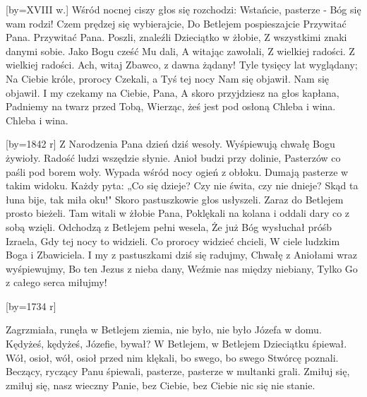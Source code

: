 \endsong
[by={XVIII w.}]
\beginverse
    Wśród nocnej ciszy głos się rozchodzi:
    Wstańcie, pasterze - Bóg się wam rodzi!
    Czem prędzej się wybierajcie,
    Do Betlejem pospieszajcie
    Przywitać Pana.
    Przywitać Pana.
\endverse
\beginverse
    Poszli, znaleźli Dzieciątko w żłobie,
    Z wszystkimi znaki danymi sobie.
    Jako Bogu cześć Mu dali,
    A witając zawołali,
    Z wielkiej radości.
    Z wielkiej radości.
\endverse
\beginverse
    Ach, witaj Zbawco, z dawna żądany!
    Tyle tysięcy lat wyglądany;
    Na Ciebie króle, prorocy
    Czekali, a Tyś tej nocy
    Nam się objawił.
    Nam się objawił.
\endverse
\beginverse
    I my czekamy na Ciebie, Pana,
    A skoro przyjdziesz na głos kapłana,
    Padniemy na twarz przed Tobą,
    Wierząc, żeś jest pod osłoną
    Chleba i wina.
    Chleba i wina.
\endverse
\endsong

[by={1842 r}]
\beginverse
Z Narodzenia Pana dzień dziś wesoły.
Wyśpiewują chwałę Bogu żywioły.
Radość ludzi wszędzie słynie.
Anioł budzi przy dolinie,
Pasterzów co paśli pod borem woły.
\endverse
\beginverse
Wypada wśród nocy ogień z obłoku.
Dumają pasterze w takim widoku.
Każdy pyta: „Co się dzieje?
Czy nie świta, czy nie dnieje?
Skąd ta łuna bije, tak miła oku!"
\endverse
\beginverse
Skoro pastuszkowie głos usłyszeli.
Zaraz do Betlejem prosto bieżeli.
Tam witali w żłobie Pana,
Poklękali na kolana i oddali dary co z sobą wzięli.
\endverse
\beginverse
Odchodzą z Betlejem pełni wesela,
Że już Bóg wysłuchał próśb Izraela,
Gdy tej nocy to widzieli.
Co prorocy widzieć chcieli,
W ciele ludzkim Boga i Zbawiciela.
\endverse
\beginverse
I my z pastuszkami dziś się radujmy,
Chwałę z Aniołami wraz wyśpiewujmy,
Bo ten Jezus z nieba dany,
Weźmie nas między niebiany,
Tylko Go z całego serca miłujmy!
\endverse
\endsong


[by={1734 r}]

\beginverse
Zagrzmiała, runęła w Betlejem ziemia,
nie było, nie było Józefa w domu.
\endverse
\beginverse
Kędyżeś, kędyżeś, Józefie, bywał?
W Betlejem, w Betlejem Dzieciątku śpiewał.
\endverse
\beginverse
Wół, osioł, wół, osioł przed nim klękali,
bo swego, bo swego Stwórcę poznali.
\endverse
\beginverse
Beczący, ryczący Panu śpiewali,
pasterze, pasterze w multanki grali.
\endverse
\beginverse
Zmiłuj się, zmiłuj się, nasz wieczny Panie,
bez Ciebie, bez Ciebie nic się nie stanie.
\endverse
\endsong


